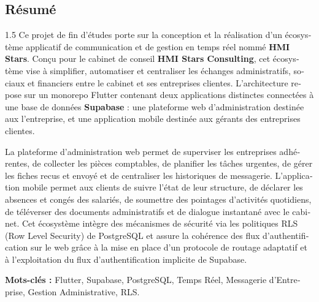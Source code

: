 \begin{otherlanguage}{french}
\chapter*{Résumé}
\begin{spacing}{1.5}
Ce projet de fin d'études porte sur la conception et la réalisation d'un écosystème applicatif de communication et de gestion en temps réel nommé \textbf{HMI Stars}. Conçu pour le cabinet de conseil \textbf{HMI Stars Consulting}, cet écosystème vise à simplifier, automatiser et centraliser les échanges administratifs, sociaux et financiers entre le cabinet et ses entreprises clientes. L'architecture repose sur un monorepo Flutter contenant deux applications distinctes connectées à une base de données \textbf{Supabase} : une plateforme web d'administration destinée aux l'entreprise, et une application mobile destinée aux gérants des entreprises clientes.

La plateforme d'administration web permet de superviser les entreprises adhérentes, de collecter les pièces comptables, de planifier les tâches urgentes, de gérer les fiches recus et envoyé et de centraliser les historiques de messagerie. L'application mobile permet aux clients de suivre l'état de leur structure, de déclarer les absences et congés des salariés, de soumettre des pointages d'activités quotidiens, de téléverser des documents administratifs et de dialogue instantané avec le cabinet. Cet écosystème intègre des mécanismes de sécurité via les politiques RLS (Row Level Security) de PostgreSQL et assure la cohérence des flux d'authentification sur le web grâce à la mise en place d'un protocole de routage adaptatif et à l'exploitation du flux d'authentification implicite de Supabase.

\textbf{Mots-clés :} Flutter, Supabase, PostgreSQL, Temps Réel, Messagerie d'Entreprise, Gestion Administrative, RLS.
\end{spacing}
\end{otherlanguage}
